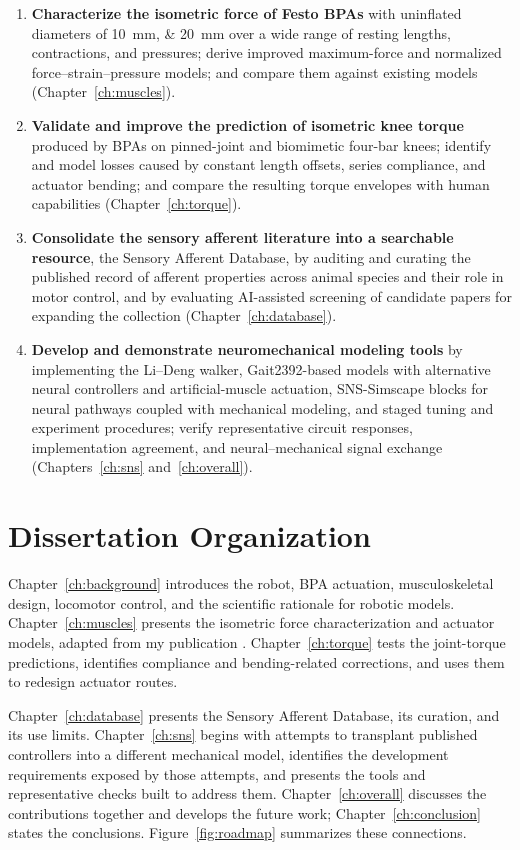 \begin{enumerate}
    \item \textbf{Characterize the isometric force of Festo BPAs} with uninflated diameters of \qtylist{10;20}{\mm} over a wide range of resting lengths, contractions, and pressures; derive improved maximum-force and normalized force--strain--pressure models; and compare them against existing models (Chapter~\ref{ch:muscles}).
    \item \textbf{Validate and improve the prediction of isometric knee torque} produced by BPAs on pinned-joint and biomimetic four-bar knees; identify and model losses caused by constant length offsets, series compliance, and actuator bending; and compare the resulting torque envelopes with human capabilities (Chapter~\ref{ch:torque}).
    \item \textbf{Consolidate the sensory afferent literature into a searchable resource}, the Sensory Afferent Database, by auditing and curating the published record of afferent properties across animal species and their role in motor control, and by evaluating AI-assisted screening of candidate papers for expanding the collection (Chapter~\ref{ch:database}).
\item \textbf{Develop and demonstrate neuromechanical modeling tools} by implementing the Li--Deng walker, Gait2392-based models with alternative neural controllers and artificial-muscle actuation, SNS-Simscape blocks for neural pathways coupled with mechanical modeling, and staged tuning and experiment procedures; verify representative circuit responses, implementation agreement, and neural--mechanical signal exchange (Chapters~\ref{ch:sns} and~\ref{ch:overall}).
\end{enumerate}

\section{Dissertation Organization}\label{sec:organization}

Chapter~\ref{ch:background} introduces the robot, BPA actuation, musculoskeletal design, locomotor control, and the scientific rationale for robotic models. Chapter~\ref{ch:muscles} presents the isometric force characterization and actuator models, adapted from my publication \citep{bolen_2026}. Chapter~\ref{ch:torque} tests the joint-torque predictions, identifies compliance and bending-related corrections, and uses them to redesign actuator routes.

Chapter~\ref{ch:database} presents the Sensory Afferent Database, its curation, and its use limits. Chapter~\ref{ch:sns} begins with attempts to transplant published controllers into a different mechanical model, identifies the development requirements exposed by those attempts, and presents the tools and representative checks built to address them. Chapter~\ref{ch:overall} discusses the contributions together and develops the future work; Chapter~\ref{ch:conclusion} states the conclusions. Figure~\ref{fig:roadmap} summarizes these connections.

